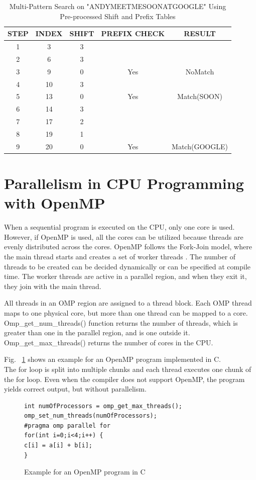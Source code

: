\begin {table}[H]
\centering
\caption {Multi-Pattern Search on "ANDYMEETMESOONATGOOGLE" Using Pre-processed Shift and Prefix Tables} \label{tab:searchwuman}
\begin{tabular}{|c|c|c|c|c|}
\midrule
STEP & INDEX & SHIFT & PREFIX CHECK & RESULT\\
\midrule
1 & 3 & 3 & &\\
\midrule
2 & 6 & 3 & &\\
\midrule
3 & 9 & 0 & Yes & NoMatch\\
\midrule
4 & 10 & 3 & &\\
\midrule
5 & 13 & 0 & Yes & Match(SOON)\\
\midrule
6 & 14 & 3 & &\\
\midrule
7 & 17 & 2 & &\\
\midrule
8 & 19 & 1 & &\\
\midrule
9 & 20 & 0 & Yes & Match(GOOGLE)\\
\midrule
\end{tabular}
\end{table}
\squeezeup



\section{Parallelism in CPU Programming with OpenMP}
When a sequential program is executed on the CPU, only one core is used. However, if OpenMP is used, all the cores can be utilized because threads are evenly distributed across the cores. OpenMP follows the Fork-Join model, where the main thread starts and creates a set of worker threads \cite{bib31}. The number of threads to be created can be decided dynamically or can be specified at compile time. The worker threads are active in a parallel region, and when they exit it, they join with the main thread.

All threads in an OMP region are assigned to a thread block. Each OMP thread maps to one physical core, but more than one thread can be mapped to a core. 
Omp\_get\_num\_threads() function returns the number of threads, which is greater than one in the parallel region, and is one outside it. Omp\_get\_max\_threads() returns the number of cores in the CPU. 

Fig. ~\ref{fig:openmp} shows an example for an OpenMP program implemented in C. \\ The for loop is split into multiple chunks and each thread executes one chunk of the for loop. 
Even when the compiler does not support OpenMP, the program yields correct output, but without parallelism.

\begin{figure}[H]
\centering
\begin{lstlisting}
int numOfProcessors = omp_get_max_threads();
omp_set_num_threads(numOfProcessors);
#pragma omp parallel for
for(int i=0;i<4;i++) {
c[i] = a[i] + b[i];
}
\end{lstlisting}
\caption{Example for an OpenMP program in C}
\label{fig:openmp}
\end{figure}
\squeezeup